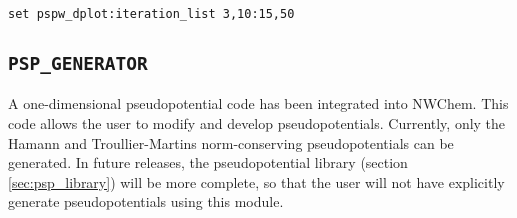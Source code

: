\begin{verbatim}
set pspw_dplot:iteration_list 3,10:15,50
\end{verbatim}


\subsection{\tt PSP\_GENERATOR}
\label{sec:pspw_psp_generator}
A one-dimensional pseudopotential code has been integrated into NWChem.
This code allows the user to modify and develop pseudopotentials.  Currently, 
only the Hamann and Troullier-Martins norm-conserving pseudopotentials can be
generated.  In future releases, the pseudopotential library (section \ref{sec:psp_library})
will be more complete, so that the user will not have explicitly generate
pseudopotentials using this module.

